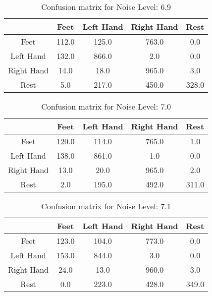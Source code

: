 \begin{table}[!htbp]
    \centering
    \begin{tabular}{|c||c|c|c|c|}
        \hline
		 & Feet & Left Hand & Right Hand & Rest \\
        \hline
        \hline
        Feet & 112.0 & 125.0 & 763.0 & 0.0 \\
        \hline
        Left Hand & 132.0 & 866.0 & 2.0 & 0.0 \\
        \hline
        Right Hand & 14.0 & 18.0 & 965.0 & 3.0 \\
        \hline
        Rest & 5.0 & 217.0 & 450.0 & 328.0 \\
        \hline
    \end{tabular}
    \caption{Confusion matrix for Noise Level: 6.9}
\end{table}

\begin{table}[!htbp]
    \centering
    \begin{tabular}{|c||c|c|c|c|}
        \hline
		 & Feet & Left Hand & Right Hand & Rest \\
        \hline
        \hline
        Feet & 120.0 & 114.0 & 765.0 & 1.0 \\
        \hline
        Left Hand & 138.0 & 861.0 & 1.0 & 0.0 \\
        \hline
        Right Hand & 13.0 & 20.0 & 965.0 & 2.0 \\
        \hline
        Rest & 2.0 & 195.0 & 492.0 & 311.0 \\
        \hline
    \end{tabular}
    \caption{Confusion matrix for Noise Level: 7.0}
\end{table}

\begin{table}[!htbp]
    \centering
    \begin{tabular}{|c||c|c|c|c|}
        \hline
		 & Feet & Left Hand & Right Hand & Rest \\
        \hline
        \hline
        Feet & 123.0 & 104.0 & 773.0 & 0.0 \\
        \hline
        Left Hand & 153.0 & 844.0 & 3.0 & 0.0 \\
        \hline
        Right Hand & 24.0 & 13.0 & 960.0 & 3.0 \\
        \hline
        Rest & 0.0 & 223.0 & 428.0 & 349.0 \\
        \hline
    \end{tabular}
    \caption{Confusion matrix for Noise Level: 7.1}
\end{table}

